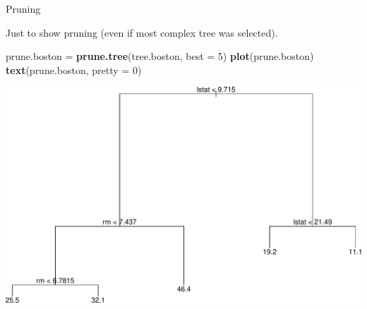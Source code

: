\documentclass[ignorenonframetext,]{beamer}
\newenvironment{Shaded}{\begin{snugshade}}{\end{snugshade}}
\newcommand{\KeywordTok}[1]{\textcolor[rgb]{0.13,0.29,0.53}{\textbf{#1}}}
\newcommand{\DataTypeTok}[1]{\textcolor[rgb]{0.13,0.29,0.53}{#1}}
\newcommand{\DecValTok}[1]{\textcolor[rgb]{0.00,0.00,0.81}{#1}}
\newcommand{\StringTok}[1]{\textcolor[rgb]{0.31,0.60,0.02}{#1}}
\newcommand{\NormalTok}[1]{#1}
\begin{document}
\begin{frame}[fragile]

\begin{block}{Pruning}

Just to show pruning (even if most complex tree was selected).

\begin{Shaded}
\begin{Highlighting}[]
\NormalTok{prune.boston =}\StringTok{ }\KeywordTok{prune.tree}\NormalTok{(tree.boston, }\DataTypeTok{best =} \DecValTok{5}\NormalTok{)}
\KeywordTok{plot}\NormalTok{(prune.boston)}
\KeywordTok{text}\NormalTok{(prune.boston, }\DataTypeTok{pretty =} \DecValTok{0}\NormalTok{)}
\end{Highlighting}
\end{Shaded}

\includegraphics{8TreesBEAMER_files/figure-beamer/unnamed-chunk-41-1.pdf}

\end{block}

\end{frame}
\end{document}

